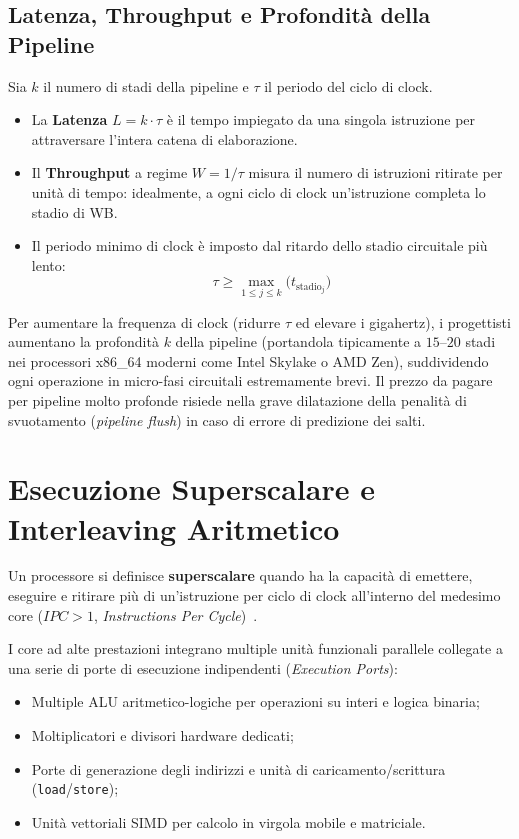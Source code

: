 \FloatBarrier
\subsection{Latenza, Throughput e Profondit\`a della Pipeline}
\label{subsec:latenza-throughput-pipeline}

Sia $k$ il numero di stadi della pipeline e $\tau$ il periodo del ciclo di clock.
\begin{itemize}
    \item La \textbf{Latenza} $L = k \cdot \tau$ \`e il tempo impiegato da una singola istruzione per attraversare l'intera catena di elaborazione.
    \item Il \textbf{Throughput} a regime $W = 1/\tau$ misura il numero di istruzioni ritirate per unit\`a di tempo: idealmente, a ogni ciclo di clock un'istruzione completa lo stadio di WB.
    \item Il periodo minimo di clock \`e imposto dal ritardo dello stadio circuitale pi\`u lento:
    \begin{equation}
    \tau \ge \max_{1 \le j \le k} \big(t_{\text{stadio}_j}\big)
    \end{equation}
\end{itemize}

Per aumentare la frequenza di clock (ridurre $\tau$ ed elevare i gigahertz), i progettisti aumentano la profondit\`a $k$ della pipeline (portandola tipicamente a $15\text{--}20$ stadi nei processori x86\_64 moderni come Intel Skylake o AMD Zen), suddividendo ogni operazione in micro-fasi circuitali estremamente brevi. Il prezzo da pagare per pipeline molto profonde risiede nella grave dilatazione della penalit\`a di svuotamento (\textit{pipeline flush}) in caso di errore di predizione dei salti.

\FloatBarrier
\section{Esecuzione Superscalare e Interleaving Aritmetico}
\label{sec:esecuzione-superscalare}

Un processore si definisce \textbf{superscalare} quando ha la capacit\`a di emettere, eseguire e ritirare pi\`u di un'istruzione per ciclo di clock all'interno del medesimo core ($IPC > 1$, \textit{Instructions Per Cycle})~\cite{bakhvalov2024}. 

I core ad alte prestazioni integrano multiple unit\`a funzionali parallele collegate a una serie di porte di esecuzione indipendenti (\textit{Execution Ports}):
\begin{itemize}
    \item Multiple ALU aritmetico-logiche per operazioni su interi e logica binaria;
    \item Moltiplicatori e divisori hardware dedicati;
    \item Porte di generazione degli indirizzi e unit\`a di caricamento/scrittura (\texttt{load}/\texttt{store});
    \item Unit\`a vettoriali SIMD per calcolo in virgola mobile e matriciale.
\end{itemize}

